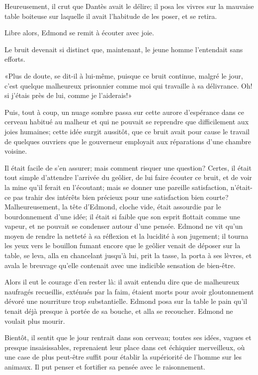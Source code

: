 Heureusement, il crut que Dantès avait le délire; il posa les vivres sur la mauvaise table boiteuse sur laquelle il avait l'habitude de les poser, et se retira.

Libre alors, Edmond se remit à écouter avec joie.

Le bruit devenait si distinct que, maintenant, le jeune homme l'entendait sans efforts.

«Plus de doute, se dit-il à lui-même, puisque ce bruit continue, malgré le jour, c'est quelque malheureux prisonnier comme moi qui travaille à sa délivrance. Oh! si j'étais près de lui, comme je l'aiderais!»

Puis, tout à coup, un nuage sombre passa sur cette aurore d'espérance dans ce cerveau habitué au malheur et qui ne pouvait se reprendre que difficilement aux joies humaines; cette idée surgit aussitôt, que ce bruit avait pour cause le travail de quelques ouvriers que le gouverneur employait aux réparations d'une chambre voisine.

Il était facile de s'en assurer; mais comment risquer une question? Certes, il était tout simple d'attendre l'arrivée du geôlier, de lui faire écouter ce bruit, et de voir la mine qu'il ferait en l'écoutant; mais se donner une pareille satisfaction, n'était-ce pas trahir des intérêts bien précieux pour une satisfaction bien courte? Malheureusement, la tête d'Edmond, cloche vide, était assourdie par le bourdonnement d'une idée; il était si faible que son esprit flottait comme une vapeur, et ne pouvait se condenser autour d'une pensée. Edmond ne vit qu'un moyen de rendre la netteté à sa réflexion et la lucidité à son jugement; il tourna les yeux vers le bouillon fumant encore que le geôlier venait de déposer sur la table, se leva, alla en chancelant jusqu'à lui, prit la tasse, la porta à ses lèvres, et avala le breuvage qu'elle contenait avec une indicible sensation de bien-être.

Alors il eut le courage d'en rester là: il avait entendu dire que de malheureux naufragés recueillis, exténués par la faim, étaient morts pour avoir gloutonnement dévoré une nourriture trop substantielle. Edmond posa sur la table le pain qu'il tenait déjà presque à portée de sa bouche, et alla se recoucher. Edmond ne voulait plus mourir.

Bientôt, il sentit que le jour rentrait dans son cerveau; toutes ses idées, vagues et presque insaisissables, reprenaient leur place dans cet échiquier merveilleux, où une case de plus peut-être suffit pour établir la supériorité de l'homme sur les animaux. Il put penser et fortifier sa pensée avec le raisonnement.


